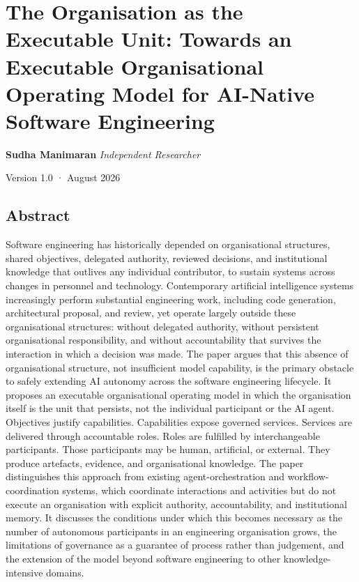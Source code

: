\documentclass[
]{article}
\author{}
\date{}
\begin{document}
\hypertarget{the-organisation-as-the-executable-unit-towards-an-executable-organisational-operating-model-for-ai-native-software-engineering}{%
\section{The Organisation as the Executable Unit: Towards an Executable
Organisational Operating Model for AI-Native Software
Engineering}\label{the-organisation-as-the-executable-unit-towards-an-executable-organisational-operating-model-for-ai-native-software-engineering}}

\textbf{Sudha Manimaran} \emph{Independent Researcher}

Version 1.0 · August 2026

\hypertarget{abstract}{%
\subsection{Abstract}\label{abstract}}

Software engineering has historically depended on organisational
structures, shared objectives, delegated authority, reviewed decisions,
and institutional knowledge that outlives any individual contributor, to
sustain systems across changes in personnel and technology. Contemporary
artificial intelligence systems increasingly perform substantial
engineering work, including code generation, architectural proposal, and
review, yet operate largely outside these organisational structures:
without delegated authority, without persistent organisational
responsibility, and without accountability that survives the interaction
in which a decision was made. The paper argues that this absence of
organisational structure, not insufficient model capability, is the
primary obstacle to safely extending AI autonomy across the software
engineering lifecycle. It proposes an executable organisational
operating model in which the organisation itself is the unit that
persists, not the individual participant or the AI agent. Objectives
justify capabilities. Capabilities expose governed services. Services
are delivered through accountable roles. Roles are fulfilled by
interchangeable participants. Those participants may be human,
artificial, or external. They produce artefacts, evidence, and
organisational knowledge. The paper distinguishes this approach from
existing agent-orchestration and workflow-coordination systems, which
coordinate interactions and activities but do not execute an
organisation with explicit authority, accountability, and institutional
memory. It discusses the conditions under which this becomes necessary
as the number of autonomous participants in an engineering organisation
grows, the limitations of governance as a guarantee of process rather
than judgement, and the extension of the model beyond software
engineering to other knowledge-intensive domains.
\end{document}
